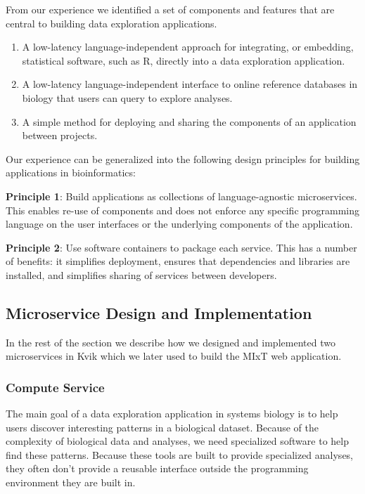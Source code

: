 From our experience we identified a set of components and features that are
central to building data exploration applications.

\begin{enumerate}
    \item A low-latency language-independent approach for integrating, or
        embedding, statistical software, such as R, directly into a data
        exploration application. 
    \item A low-latency language-independent interface to online reference
        databases in biology that users can query to explore analyses. 
    \item A simple method for deploying and sharing the components of an
        application between projects. 
\end{enumerate} 

Our experience can be generalized into the following design principles for
building applications in bioinformatics: 

\textbf{Principle 1}: Build applications as collections of language-agnostic
microservices. This enables re-use of components and does not enforce any
specific programming language on the user interfaces or the underlying
components of the application. 

\textbf{Principle 2}: Use software containers to package each service. This has
a number of benefits: it simplifies deployment, ensures that dependencies and
libraries are installed, and  simplifies sharing of services between
developers. 

\subsection*{Microservice Design and Implementation}
In the rest of the section we describe how we designed and implemented two
microservices in Kvik\cite{fjukstad2015kvik} which we later used to build the
MIxT web application.

\subsubsection*{Compute Service}
The main goal of a data exploration application in systems biology is to help
users discover interesting patterns in a biological dataset. Because of the
complexity of biological data and analyses, we need specialized software to help
find these patterns.  Because these tools are built to provide specialized
analyses, they often don't provide a reusable interface outside the programming
environment they are built in. 

